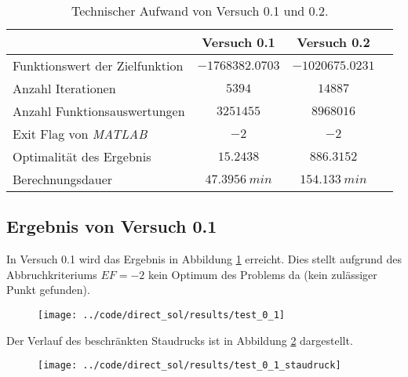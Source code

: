 \begin{table}[H]
    \centering
    \caption{Technischer Aufwand von Versuch 0.1 und 0.2.}\label{tab:Versuch0_TA}
    \begin{tabularx}{.9\textwidth}{Zccc}
        \toprule
         & \textbf{Versuch 0.1} & \textbf{Versuch 0.2} \\
        \midrule
        Funktionswert der Zielfunktion & $-1768382.0703$ & $-1020675.0231$ \\
        Anzahl Iterationen & $5394$ & $14887$ \\
        Anzahl Funktionsauswertungen & $3251455$ & $8968016$ \\
        Exit Flag von \textit{MATLAB} & $-2$ & $-2$ \\
        Optimalität des Ergebnis & $15.2438$ & $886.3152$ \\
        Berechnungsdauer & $47.3956 \ min$ & $154.133 \ min$ \\
        \bottomrule
    \end{tabularx}
\end{table}



\subsection{Ergebnis von Versuch 0.1}\label{kap:Versuch01}
In Versuch 0.1 wird das Ergebnis in Abbildung \ref{img:test_0_1} erreicht. Dies stellt aufgrund des Abbruchkriteriums $EF = -2$ kein Optimum des Problems da (kein zulässiger Punkt gefunden). 
\begin{figure}[H]
\begin{center}
\texttt{[image: ../code/direct\_sol/results/test\_0\_1]}
 \label{img:test_0_1}
\end{center}
\end{figure}
Der Verlauf des beschränkten Staudrucks ist in Abbildung \ref{img:test_0_1_staudruck} dargestellt.
\begin{figure}[H]
\begin{center}
\texttt{[image: ../code/direct\_sol/results/test\_0\_1\_staudruck]}
 \label{img:test_0_1_staudruck}
\end{center}
\end{figure}





